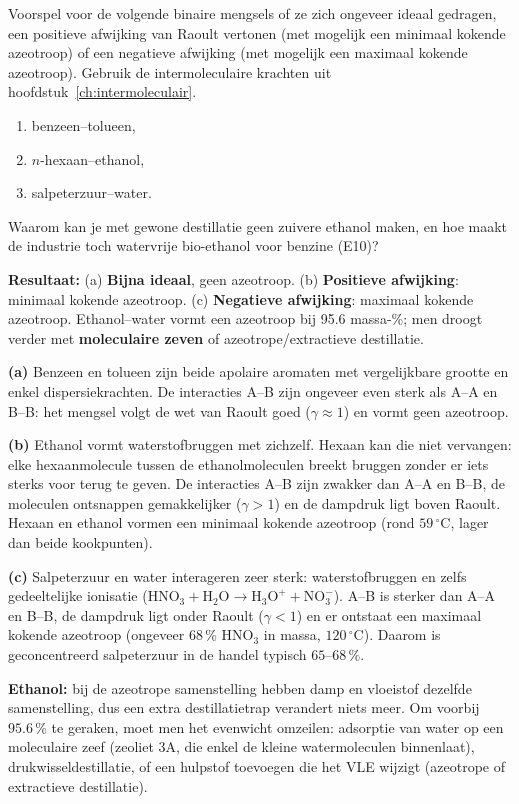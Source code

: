 \begin{oefening}
Voorspel voor de volgende binaire mengsels of ze zich ongeveer ideaal gedragen, een positieve afwijking van Raoult vertonen (met mogelijk een minimaal kokende azeotroop) of een negatieve afwijking (met mogelijk een maximaal kokende azeotroop). Gebruik de intermoleculaire krachten uit hoofdstuk~\ref{ch:intermoleculair}.

\begin{enumerate}
\item[(a)]
  benzeen--tolueen,
\item[(b)]
  \(n\)-hexaan--ethanol,
\item[(c)]
  salpeterzuur--water.
\end{enumerate}

Waarom kan je met gewone destillatie geen zuivere ethanol maken, en hoe maakt de industrie toch watervrije bio-ethanol voor benzine (E10)?
\end{oefening}
\begin{oplossing}
\textbf{Resultaat:} (a) \textbf{Bijna ideaal}, geen azeotroop. (b) \textbf{Positieve afwijking}: minimaal kokende azeotroop. (c) \textbf{Negatieve afwijking}: maximaal kokende azeotroop. Ethanol--water vormt een azeotroop bij 95.6 massa-\%; men droogt verder met \textbf{moleculaire zeven} of azeotrope/extractieve destillatie.

\textbf{(a)} Benzeen en tolueen zijn beide apolaire aromaten met vergelijkbare grootte en enkel dispersiekrachten. De interacties A--B zijn ongeveer even sterk als A--A en B--B: het mengsel volgt de wet van Raoult goed (\(\gamma \approx 1\)) en vormt geen azeotroop.

\textbf{(b)} Ethanol vormt waterstofbruggen met zichzelf. Hexaan kan die niet vervangen: elke hexaanmolecule tussen de ethanolmoleculen breekt bruggen zonder er iets sterks voor terug te geven. De interacties A--B zijn zwakker dan A--A en B--B, de moleculen ontsnappen gemakkelijker (\(\gamma > 1\)) en de dampdruk ligt boven Raoult. Hexaan en ethanol vormen een minimaal kokende azeotroop (rond \(59\,^\circ\mathrm{C}\), lager dan beide kookpunten).

\textbf{(c)} Salpeterzuur en water interageren zeer sterk: waterstofbruggen en zelfs gedeeltelijke ionisatie (\(\mathrm{HNO_3 + H_2O \rightarrow H_3O^+ + NO_3^-}\)). A--B is sterker dan A--A en B--B, de dampdruk ligt onder Raoult (\(\gamma < 1\)) en er ontstaat een maximaal kokende azeotroop (ongeveer \(68\,\%\) \(\mathrm{HNO_3}\) in massa, \(120\,^\circ\mathrm{C}\)). Daarom is geconcentreerd salpeterzuur in de handel typisch \(65\)--\(68\,\%\).

\textbf{Ethanol:} bij de azeotrope samenstelling hebben damp en vloeistof dezelfde samenstelling, dus een extra destillatietrap verandert niets meer. Om voorbij \(95.6\,\%\) te geraken, moet men het evenwicht omzeilen: adsorptie van water op een moleculaire zeef (zeoliet 3A, die enkel de kleine watermoleculen binnenlaat), drukwisseldestillatie, of een hulpstof toevoegen die het VLE wijzigt (azeotrope of extractieve destillatie).
\end{oplossing}

